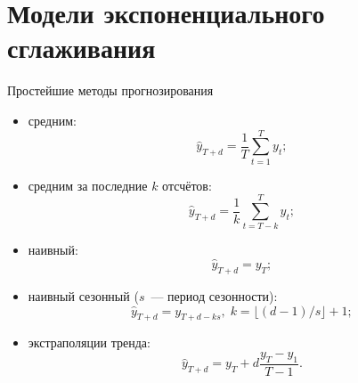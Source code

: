 \documentclass[10pt,pdf,utf8,hyperref={unicode},aspectratio=169]{beamer}
\begin{document}
	




\section{Модели экспоненциального сглаживания}



\begin{frame}{Простейшие методы прогнозирования}
	\begin{itemize}
		\item средним:
		$$\hat{y}_{T+d} = \frac1{T}\sum_{t=1}^T y_t;$$
		\item средним за последние $k$ отсчётов:
		$$\hat{y}_{T+d} = \frac1{k}\sum_{t=T-k}^T y_t;$$
		\item наивный:
		$$\hat{y}_{T+d} = y_T;$$
		\item наивный сезонный ($s$~--- период сезонности):
		$$\hat{y}_{T+d} = y_{T+d-ks}, \; k = \lfloor\left(d-1\right)/s\rfloor+1;$$
		\item экстраполяции тренда:
		$$\hat{y}_{T+d} = y_T + d \frac{y_T-y_1}{T-1}.$$
	\end{itemize}
\end{frame}
\end{document}
